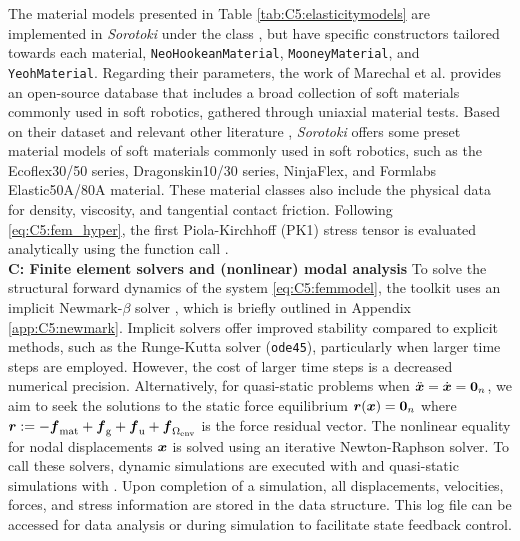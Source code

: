 The material models presented in Table \ref{tab:C5:elasticitymodels} are implemented in \textit{Sorotoki} under the class , but have specific constructors tailored towards each material, \texttt{NeoHookeanMaterial}, \texttt{MooneyMaterial}, and \texttt{YeohMaterial}. Regarding their parameters, the work of Marechal et al. \cite{Marechal2021Jun} provides an open-source database that includes a broad collection of soft materials commonly used in soft robotics, gathered through uniaxial material tests. Based on their dataset and relevant other literature \cite{Xavier2022Jun,Smith2018,Kim2018,Goury2018}, \textit{Sorotoki} offers some preset material models of soft materials commonly used in soft robotics, such as the Ecoflex30/50 series, Dragonskin10/30 series, NinjaFlex, and Formlabs Elastic50A/80A material. These material classes also include the physical data for density, viscosity, and tangential contact friction. Following \eqref{eq:C5:fem_hyper}, the first Piola-Kirchhoff (PK1) stress tensor is evaluated analytically using the function call .  \\
%

\textbf{C: Finite element solvers and (nonlinear) modal analysis}
To solve the structural forward dynamics of the system \eqref{eq:C5:femmodel}, the toolkit uses an implicit Newmark-$\beta$ solver \cite{Newmark1959Jul}, which is briefly outlined in Appendix \ref{app:C5:newmark}. Implicit solvers offer improved stability compared to explicit methods, such as the Runge-Kutta solver (\texttt{ode45}), particularly when larger time steps are employed. However, the cost of larger time steps is a decreased numerical precision.  Alternatively, for quasi-static problems when ${\ddot{\boldsymbol{x}}} = {\dot{\boldsymbol{x}}} = \boldsymbol{0}_n$, we aim to seek the solutions to the static force equilibrium ${\boldsymbol{r}}({\boldsymbol{x}}) = \boldsymbol{0}_n$ where ${\boldsymbol{r}} := -{\boldsymbol{f}}_{\textrm{mat}} + {\boldsymbol{f}}_{\scriptstyle\textrm{g}} + {\boldsymbol{f}}_\textrm{u} + {\boldsymbol{f}}_{\Omega_{\textrm{env}}}$ is the force residual vector. The nonlinear equality for nodal displacements ${\boldsymbol{x}}$ is solved using an iterative Newton-Raphson solver. To call these solvers, dynamic simulations are executed with  and quasi-static simulations with . Upon completion of a simulation, all displacements, velocities, forces, and stress information are stored in the  data structure. This log file can be accessed for data analysis or during simulation to facilitate state feedback control.

